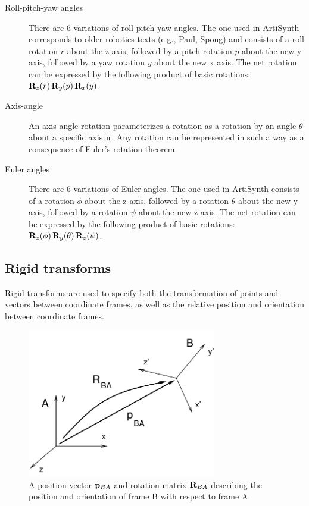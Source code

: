 \begin{description}

\item[Roll-pitch-yaw angles]\mbox{}

There are 6 variations of roll-pitch-yaw angles. The one used in
ArtiSynth corresponds to older robotics texts (e.g., Paul, Spong) and
consists of a roll rotation $r$ about the z axis, followed by a pitch
rotation $p$ about the new y axis, followed by a yaw rotation $y$
about the new x axis. The net rotation can be expressed by the
following product of basic rotations: ${\bf R}_z(r) \, {\bf R}_y(p) \, {\bf R}_x(y)$.

\item[Axis-angle]\mbox{}

An axis angle rotation parameterizes a rotation as a rotation by
an angle $\theta$ about a specific axis ${\bf u}$. Any rotation
can be represented in such a way as a consequence of Euler's rotation
theorem.

\item[Euler angles]\mbox{}

There are 6 variations of Euler angles. The one used in ArtiSynth
consists of a rotation $\phi$ about the z axis, followed by a rotation
$\theta$ about the new y axis, followed by a rotation $\psi$ about the
new z axis. The net rotation can be expressed by the following product
of basic rotations: ${\bf R}_z(\phi) \, {\bf R}_y(\theta) \, {\bf R}_z(\psi)$.

\end{description}

\subsection{Rigid transforms}
\label{RigidTransforms:sec}

Rigid transforms are used to specify both the transformation of points
and vectors between coordinate frames, as well as the relative
position and orientation between coordinate frames.

\begin{figure}[ht]
\begin{center}
 \includegraphics[width=3.25in]{images/framesAB}
\end{center}
\caption{A position vector ${\bf p}_{BA}$ and rotation matrix
${\bf R}_{BA}$ describing the position and orientation of frame B
with respect to frame A.}
\label{framesAB:fig}
\end{figure}

